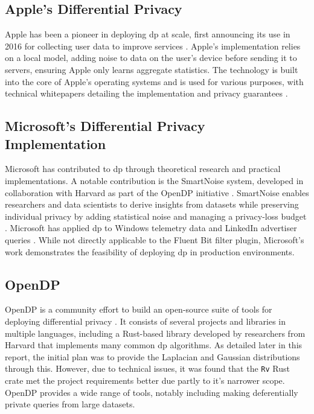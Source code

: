 \subsection{Apple's Differential Privacy}
Apple has been a pioneer in deploying \acrshort{dp} at scale, first announcing its use in 2016 for collecting user data to improve services \cite{tang2017privacy,AppleDifferentialPrivacy2017}. Apple's implementation relies on a local model, adding noise to data on the user's device before sending it to servers, ensuring Apple only learns aggregate statistics. The technology is built into the core of Apple's operating systems and is used for various purposes, with technical whitepapers detailing the implementation and privacy guarantees \cite{AppleDifferentialPrivacy2017}.

\subsection{Microsoft's Differential Privacy Implementation}
Microsoft has contributed to \acrshort{dp} through theoretical research and practical implementations. A notable contribution is the SmartNoise system, developed in collaboration with Harvard as part of the OpenDP initiative \cite{MicrosoftOpenDP,MicrosoftHarvardOpenDP}. SmartNoise enables researchers and data scientists to derive insights from datasets while preserving individual privacy by adding statistical noise and managing a privacy-loss budget \cite{MicrosoftDataResponsibly}. Microsoft has applied \acrshort{dp} to Windows telemetry data and LinkedIn advertiser queries \cite{MicrosoftDataResponsibly}. While not directly applicable to the Fluent Bit filter plugin, Microsoft's work demonstrates the feasibility of deploying \acrshort{dp} in production environments.


\subsection{OpenDP}
OpenDP is a community effort to build an open-source suite of tools for deploying differential privacy \cite{opendp2020, Vadhan2019OpenDPA}. It consists of several projects and libraries in multiple languages, including a Rust-based library developed by researchers from Harvard that implements many common \acrshort{dp} algorithms. As detailed later in this report, the initial plan was to provide the Laplacian and Gaussian distributions through this. However, due to technical issues, it was found that the \texttt{Rv} Rust crate met the project requirements better due partly to it's narrower scope. OpenDP provides a wide range of tools, notably including making deferentially private queries from large datasets.

